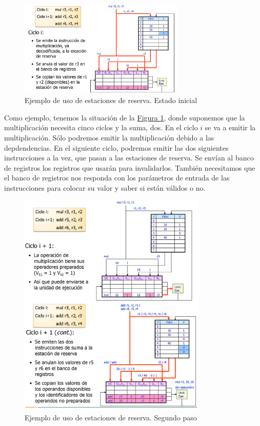 \documentclass[10pt,a4paper,spanish]{report}
\begin{document}
\begin{figure}[!h]
\centering
\includegraphics[width=0.7\textwidth]{94}
\caption{Ejemplo de uso de estaciones de reserva. Estado inicial}
\label{ejemplo_estaciones_reserva_1}
\end{figure}

Como ejemplo, tenemos la situación de la \hyperref[ejemplo_estaciones_reserva_1]{Figura \ref*{ejemplo_estaciones_reserva_1}}, donde suponemos que la multiplicación necesita cinco ciclos y la suma, dos. En el ciclo $i$ se va a emitir la multiplicación. Sólo podremos emitir la multiplicación debido a las depdendencias. En el siguiente ciclo, podremos emitir las dos siguientes instrucciones a la vez, que pasan a las estaciones de reserva. Se envían al banco de registros los registros que usarán para invalidarlos. También necesitamos que el banco de registros nos responda con los parámetros de entrada de las instrucciones para colocar su valor y saber si están válidos o no.

\begin{figure}[!h]
\centering
\includegraphics[width=0.8\textwidth]{95}
\caption{Ejemplo de uso de estaciones de reserva. Segundo paso}
\label{ejemplo_estaciones_reserva_2}
\end{figure}
\end{document}
